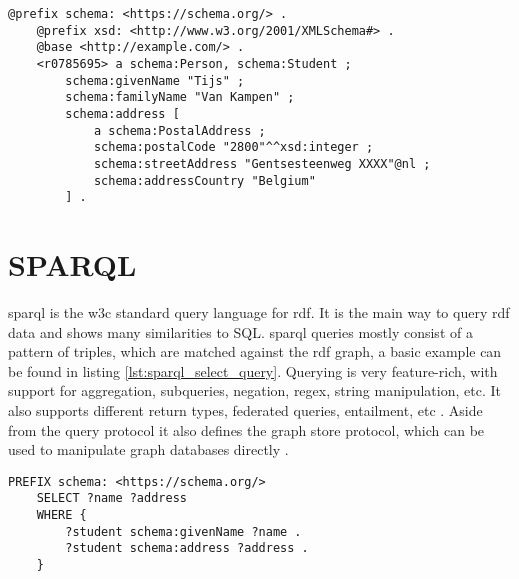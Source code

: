 \begin{lstlisting}[caption={Basic turtle document using turtle features}, label={lst:basic_turtle_example_concise}, captionpos=b, breaklines=true, float=!ht, frame=single]
    @prefix schema: <https://schema.org/> .
    @prefix xsd: <http://www.w3.org/2001/XMLSchema#> .
    @base <http://example.com/> .
    <r0785695> a schema:Person, schema:Student ;
        schema:givenName "Tijs" ;
        schema:familyName "Van Kampen" ;
        schema:address [
            a schema:PostalAddress ;
            schema:postalCode "2800"^^xsd:integer ;
            schema:streetAddress "Gentsesteenweg XXXX"@nl ;
            schema:addressCountry "Belgium"
        ] .
\end{lstlisting}


\section{SPARQL}
\acrfull{sparql} is the \acrshort{w3c} standard query language for \acrshort{rdf}. It is the main way to query \acrshort{rdf} data and shows many similarities to SQL. \acrshort{sparql} queries mostly consist of a pattern of triples, which are matched against the \acrshort{rdf} graph, a basic example can be found in listing \ref{lst:sparql_select_query}. Querying is very feature-rich, with support for aggregation, subqueries, negation, regex, string manipulation, etc. It also supports different return types, federated queries, entailment, etc \citep{SPARQL1.1QL}. Aside from the query protocol it also defines the graph store protocol, which can be used to manipulate graph databases directly \citep{SPARQL1.1}.

\begin{lstlisting}[language=SPARQL, caption={Example of a basic \acrshort{sparql} SELECT query}, label={lst:sparql_select_query}, captionpos=b, float=!ht, frame=single]
    PREFIX schema: <https://schema.org/>
    SELECT ?name ?address
    WHERE {
        ?student schema:givenName ?name .
        ?student schema:address ?address .
    }
\end{lstlisting}

